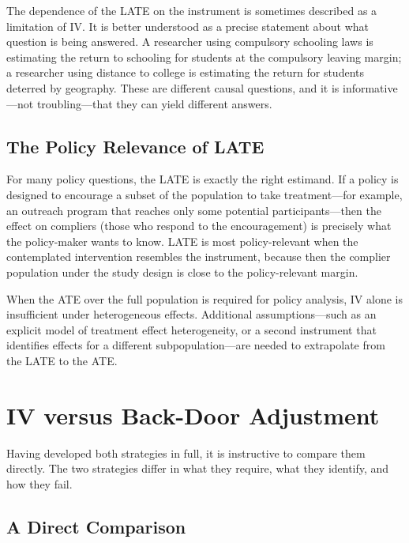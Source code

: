 \documentclass[master.tex]{subfiles}
\begin{document}
The dependence of the LATE on the instrument is sometimes described
as a limitation of IV.  It is better understood as a precise
statement about what question is being answered.  A researcher using
compulsory schooling laws is estimating the return to schooling for
students at the compulsory leaving margin; a researcher using
distance to college is estimating the return for students deterred
by geography.  These are different causal questions, and it is
informative---not troubling---that they can yield different answers.

\subsection{The Policy Relevance of LATE}

For many policy questions, the LATE is exactly the right estimand.
If a policy is designed to encourage a subset of the population to
take treatment---for example, an outreach program that reaches
only some potential participants---then the effect on compliers
(those who respond to the encouragement) is precisely what the
policy-maker wants to know.  LATE is most policy-relevant when the
contemplated intervention resembles the instrument, because then
the complier population under the study design is close to the
policy-relevant margin.

When the ATE over the full population is required for policy
analysis, IV alone is insufficient under heterogeneous effects.
Additional assumptions---such as an explicit model of treatment
effect heterogeneity, or a second instrument that identifies
effects for a different subpopulation---are needed to extrapolate
from the LATE to the ATE.


\section{IV versus Back-Door Adjustment}
\label{w7:sec:compare}

Having developed both strategies in full, it is instructive to
compare them directly.  The two strategies differ in what they
require, what they identify, and how they fail.

\subsection{A Direct Comparison}
\end{document}
